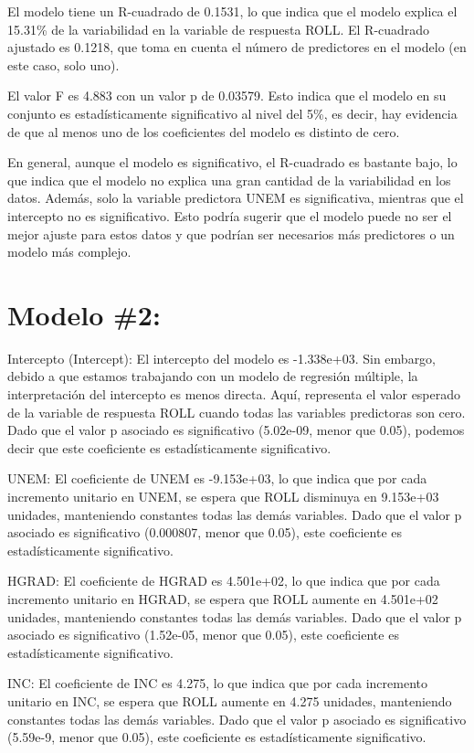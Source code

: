 \documentclass[
]{article}
\begin{document}
El modelo tiene un R-cuadrado de 0.1531, lo que indica que el modelo
explica el 15.31\% de la variabilidad en la variable de respuesta ROLL.
El R-cuadrado ajustado es 0.1218, que toma en cuenta el número de
predictores en el modelo (en este caso, solo uno).

El valor F es 4.883 con un valor p de 0.03579. Esto indica que el modelo
en su conjunto es estadísticamente significativo al nivel del 5\%, es
decir, hay evidencia de que al menos uno de los coeficientes del modelo
es distinto de cero.

En general, aunque el modelo es significativo, el R-cuadrado es bastante
bajo, lo que indica que el modelo no explica una gran cantidad de la
variabilidad en los datos. Además, solo la variable predictora UNEM es
significativa, mientras que el intercepto no es significativo. Esto
podría sugerir que el modelo puede no ser el mejor ajuste para estos
datos y que podrían ser necesarios más predictores o un modelo más
complejo.

\hypertarget{modelo-2}{%
\section{Modelo \#2:}\label{modelo-2}}

Intercepto (Intercept): El intercepto del modelo es -1.338e+03. Sin
embargo, debido a que estamos trabajando con un modelo de regresión
múltiple, la interpretación del intercepto es menos directa. Aquí,
representa el valor esperado de la variable de respuesta ROLL cuando
todas las variables predictoras son cero. Dado que el valor p asociado
es significativo (5.02e-09, menor que 0.05), podemos decir que este
coeficiente es estadísticamente significativo.

UNEM: El coeficiente de UNEM es -9.153e+03, lo que indica que por cada
incremento unitario en UNEM, se espera que ROLL disminuya en 9.153e+03
unidades, manteniendo constantes todas las demás variables. Dado que el
valor p asociado es significativo (0.000807, menor que 0.05), este
coeficiente es estadísticamente significativo.

HGRAD: El coeficiente de HGRAD es 4.501e+02, lo que indica que por cada
incremento unitario en HGRAD, se espera que ROLL aumente en 4.501e+02
unidades, manteniendo constantes todas las demás variables. Dado que el
valor p asociado es significativo (1.52e-05, menor que 0.05), este
coeficiente es estadísticamente significativo.

INC: El coeficiente de INC es 4.275, lo que indica que por cada
incremento unitario en INC, se espera que ROLL aumente en 4.275
unidades, manteniendo constantes todas las demás variables. Dado que el
valor p asociado es significativo (5.59e-9, menor que 0.05), este
coeficiente es estadísticamente significativo.
\end{document}
